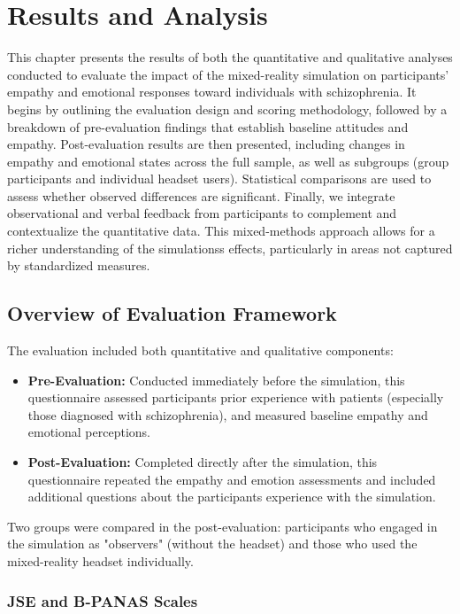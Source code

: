 \chapter{Results and Analysis}
\label{ch:resultsandanalysis}


This chapter presents the results of both the quantitative and qualitative analyses conducted to evaluate the impact of the mixed-reality simulation on participants’ empathy and emotional responses toward individuals with schizophrenia. It begins by outlining the evaluation design and scoring methodology, followed by a breakdown of pre-evaluation findings that establish baseline attitudes and empathy. Post-evaluation results are then presented, including changes in empathy and emotional states across the full sample, as well as subgroups (group participants and individual headset users). Statistical comparisons are used to assess whether observed differences are significant. Finally, we integrate observational and verbal feedback from participants to complement and contextualize the quantitative data. This mixed-methods approach allows for a richer understanding of the simulationss effects, particularly in areas not captured by standardized measures.

\section{Overview of Evaluation Framework}

The evaluation included both quantitative and qualitative components:

\begin{itemize}
  \item \textbf{Pre-Evaluation:} Conducted immediately before the simulation, this questionnaire assessed participants prior experience with patients (especially those diagnosed with schizophrenia), and measured baseline empathy and emotional perceptions.
  \item \textbf{Post-Evaluation:} Completed directly after the simulation, this questionnaire repeated the empathy and emotion assessments and included additional questions about the participants experience with the simulation.
\end{itemize}

Two groups were compared in the post-evaluation: participants who engaged in the simulation as "observers" (without the headset) and those who used the mixed-reality headset individually.

\subsection{JSE and B-PANAS Scales}


